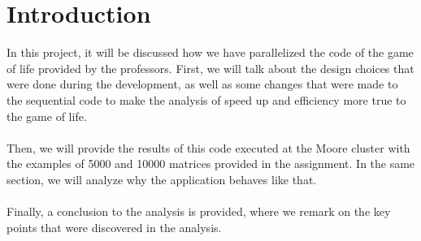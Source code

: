 \documentclass[11pt, a4paper]{article}
\begin{document}
	\section{Introduction}
	In this project, it will be discussed how we have parallelized the code of the game of life provided by the professors. First, we will talk about the design choices that were done during the development, as well as some changes that were made to the sequential code to make the analysis of speed up and efficiency more true to the game of life.\\
	\\
	Then, we will provide the results of this code executed at the Moore cluster with the examples of 5000 and 10000 matrices provided in the assignment. In the same section, we will analyze why the application behaves like that.\\
	\\
	Finally, a conclusion to the analysis is provided, where we remark on the key points that were discovered in the analysis.
	
\end{document}
